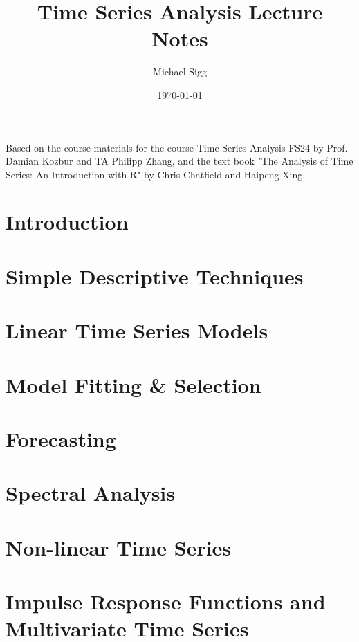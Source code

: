 \documentclass[11pt]{article}
\title{Time Series Analysis Lecture Notes}
\author{Michael Sigg}
\date{\today}
\begin{document}
\maketitle
\begin{center}
    Based on the course materials for the course Time Series Analysis FS24 by Prof. Damian Kozbur and TA Philipp Zhang, and the text book "The Analysis of Time Series: An Introduction with R" by Chris Chatfield and Haipeng Xing.
\end{center}
\tableofcontents

\newpage

\section{Introduction}


\section{Simple Descriptive Techniques}


\section{Linear Time Series Models}


\section{Model Fitting \& Selection}


\section{Forecasting}


\section{Spectral Analysis}


\section{Non-linear Time Series}


\section{Impulse Response Functions and Multivariate Time Series}

\end{document}
